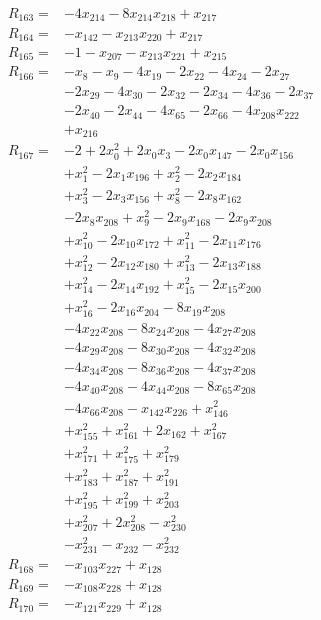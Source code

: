 \begin{align*}
R_{163}={}&-4x_{214} -8x_{214}x_{218} +x_{217}\\[3pt]
R_{164}={}&-x_{142} -x_{213}x_{220} +x_{217}\\[3pt]
R_{165}={}&-1 -x_{207} -x_{213}x_{221} +x_{215}\\[3pt]
R_{166}={}&-x_{8} -x_{9} -4x_{19} -2x_{22} -4x_{24} -2x_{27}\\
&-2x_{29} -4x_{30} -2x_{32} -2x_{34} -4x_{36} -2x_{37}\\
&-2x_{40} -2x_{44} -4x_{65} -2x_{66} -4x_{208}x_{222}\\
&+x_{216}\\[3pt]
R_{167}={}&-2 +2x_{0}^{2} +2x_{0}x_{3} -2x_{0}x_{147} -2x_{0}x_{156}\\
&+x_{1}^{2} -2x_{1}x_{196} +x_{2}^{2} -2x_{2}x_{184}\\
&+x_{3}^{2} -2x_{3}x_{156} +x_{8}^{2} -2x_{8}x_{162}\\
&-2x_{8}x_{208} +x_{9}^{2} -2x_{9}x_{168} -2x_{9}x_{208}\\
&+x_{10}^{2} -2x_{10}x_{172} +x_{11}^{2} -2x_{11}x_{176}\\
&+x_{12}^{2} -2x_{12}x_{180} +x_{13}^{2} -2x_{13}x_{188}\\
&+x_{14}^{2} -2x_{14}x_{192} +x_{15}^{2} -2x_{15}x_{200}\\
&+x_{16}^{2} -2x_{16}x_{204} -8x_{19}x_{208}\\
&-4x_{22}x_{208} -8x_{24}x_{208} -4x_{27}x_{208}\\
&-4x_{29}x_{208} -8x_{30}x_{208} -4x_{32}x_{208}\\
&-4x_{34}x_{208} -8x_{36}x_{208} -4x_{37}x_{208}\\
&-4x_{40}x_{208} -4x_{44}x_{208} -8x_{65}x_{208}\\
&-4x_{66}x_{208} -x_{142}x_{226} +x_{146}^{2}\\
&+x_{155}^{2} +x_{161}^{2} +2x_{162} +x_{167}^{2}\\
&+x_{171}^{2} +x_{175}^{2} +x_{179}^{2}\\
&+x_{183}^{2} +x_{187}^{2} +x_{191}^{2}\\
&+x_{195}^{2} +x_{199}^{2} +x_{203}^{2}\\
&+x_{207}^{2} +2x_{208}^{2} -x_{230}^{2}\\
&-x_{231}^{2} -x_{232} -x_{232}^{2}\\[3pt]
R_{168}={}&-x_{103}x_{227} +x_{128}\\[3pt]
R_{169}={}&-x_{108}x_{228} +x_{128}\\[3pt]
R_{170}={}&-x_{121}x_{229} +x_{128}\\[3pt]

\end{align*}
